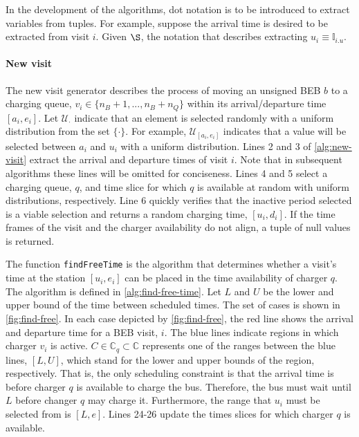\documentclass[11pt,a4paper,final]{article}
\newcommand{\I}{\mathbb{I}}                 %
\newcommand{\C}{\mathbb{C}}                 %
\newcommand{\U}{\mathcal{U}}                %
\begin{document}
In the development of the algorithms, dot notation is to be introduced to extract variables from tuples. For example,
suppose the arrival time is desired to be extracted from visit \(i\). Given \(\S\), the notation that describes extracting
\(u_i \equiv \I_{i.u}\).

\paragraph{New visit}
\label{sec:new-visit}
The new visit generator describes the process of moving an unsigned BEB \(b\) to a charging queue, \(v_i \in \{n_B+1,...,
n_B + n_Q\}\) within its arrival/departure time \([a_i, e_i]\). Let \(\U_{\cdot}\) indicate that an element is selected randomly
with a uniform distribution from the set \(\{\cdot\}\). For example, \(\U_{[a_i, e_i]}\) indicates that a value will be selected
between \(a_i\) and \(u_i\) with a uniform distribution. Lines 2 and 3 of \ref{alg:new-visit} extract the arrival and
departure times of visit \(i\). Note that in subsequent algorithms these lines will be omitted for conciseness. Lines 4
and 5 select a charging queue, \(q\), and time slice for which \(q\) is available at random with uniform distributions,
respectively. Line 6 quickly verifies that the inactive period selected is a viable selection and returns a random
charging time, \([u_i, d_i]\). If the time frames of the visit and the charger availability do not align, a tuple of null
values is returned.

The function \texttt{findFreeTime} is the algorithm that determines whether a visit's time at the station \([u_i, e_i]\) can be
placed in the time availability of charger \(q\). The algorithm is defined in \ref{alg:find-free-time}. Let \(L\) and \(U\) be
the lower and upper bound of the time between scheduled times. The set of cases is shown in \ref{fig:find-free}. In each case
depicted by \ref{fig:find-free}, the red line shows the arrival and departure time for a BEB visit, \(i\). The blue lines
indicate regions in which charger \(v_i\) is active. \(C \in \C_q \subset \C\) represents one of the ranges between the blue lines,
\([L, U]\), which stand for the lower and upper bounds of the region, respectively. That is, the only scheduling
constraint is that the arrival time is before charger \(q\) is available to charge the bus. Therefore, the bus must wait
until \(L\) before changer \(q\) may charge it. Furthermore, the range that \(u_i\) must be selected from is \([L,e]\). Lines
24-26 update the times slices for which charger \(q\) is available.
\end{document}
